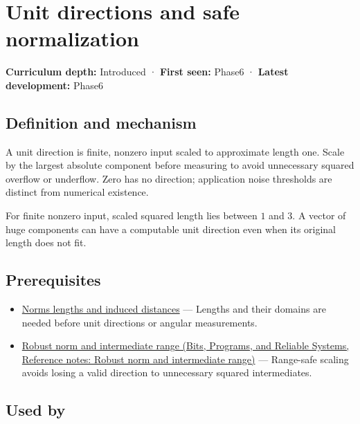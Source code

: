 \hypertarget{appendix-f744e41b95b4}{}\label{referencestart:appendix-f744e41b95b4}
\section{Unit directions and safe normalization}\label{appendix-f744e41b95b4-unit-directions-and-safe-normalization}

\textbf{Curriculum depth:} Introduced · \textbf{First seen:} Phase6 · \textbf{Latest development:} Phase6

\subsection{Definition and mechanism}\label{appendix-f744e41b95b4-definition-and-mechanism}

A unit direction is finite, nonzero input scaled to approximate length one. Scale by the largest absolute component before measuring to avoid unnecessary squared overflow or underflow. Zero has no direction; application noise thresholds are distinct from numerical existence.

For finite nonzero input, scaled squared length lies between \(1\) and \(3\). A vector of huge components can have a computable unit direction even when its original length does not fit.

\subsection{Prerequisites}\label{appendix-f744e41b95b4-prerequisites}

\begin{itemize}
\tightlist
\item
  \hyperref[appendix-49933872bb51]{Norms lengths and induced distances} --- Lengths and their domains are needed before unit directions or angular measurements.
\item
  \href{../01-Bits-Programs-and-Reliable-Systems/main.pdf\#nameddest=appendix-7f1e17dcafb1}{Robust norm and intermediate range (Bits, Programs, and Reliable Systems, Reference notes: Robust norm and intermediate range)} --- Range-safe scaling avoids losing a valid direction to unnecessary squared intermediates.
\end{itemize}

\subsection{Used by}\label{appendix-f744e41b95b4-used-by}

